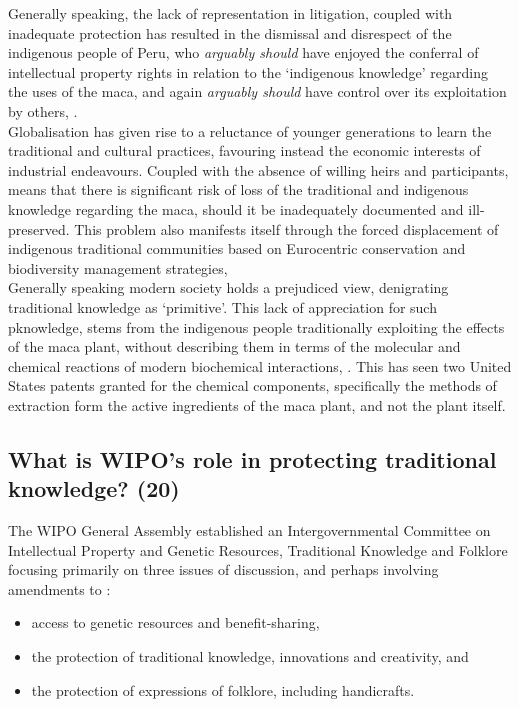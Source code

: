 \documentclass[11pt]{article}
\begin{document}
Generally speaking, the lack of representation in litigation, coupled with
inadequate protection has resulted in the dismissal and disrespect of the
indigenous people of Peru, who \emph{arguably should} have enjoyed the conferral of
intellectual property rights in relation to the `indigenous knowledge' regarding
the uses of the maca, and again \emph{arguably should} have control over its
exploitation by others, \cite{amechi15_leverag_trad_knowl_medicinal}.\\

Globalisation has given rise to a reluctance of younger generations to learn the
traditional and cultural practices, favouring instead the economic interests of
industrial endeavours. Coupled with the absence of willing heirs and
participants, means that there is significant risk of loss of the traditional
and indigenous knowledge regarding the maca, should it be inadequately
documented and ill-preserved. This problem also manifests itself through the
forced displacement of indigenous traditional communities based on Eurocentric
conservation and biodiversity management strategies, \cite{simelane09_african_trad_knowl_sys_biodiv_manag} \\

Generally speaking modern society holds a prejudiced view, denigrating
traditional knowledge as `primitive'. This lack of appreciation for such
pknowledge, stems from the indigenous people traditionally exploiting the effects
of the maca plant, without describing them in terms of the molecular and
chemical reactions of modern biochemical interactions,
\cite{amechi15_leverag_trad_knowl_medicinal}. This has seen two United States
patents granted for the chemical components, specifically the methods of
extraction form the active ingredients of the maca plant, and not the plant
itself.

\subsection{What is WIPO's role in protecting traditional knowledge? (20)}
\label{sec:org65e4c22}

The WIPO General Assembly established an Intergovernmental Committee on
Intellectual Property and Genetic Resources, Traditional Knowledge and Folklore
focusing primarily on three issues of discussion, and perhaps involving
amendments to \cite{wto17_trips,wipo83_paris_conve_protect_ip} :
\begin{itemize}
\item access to genetic resources and benefit-sharing,
\item the protection of traditional knowledge, innovations and creativity, and
\item the protection of expressions of folklore, including handicrafts.
\end{itemize}
\end{document}
